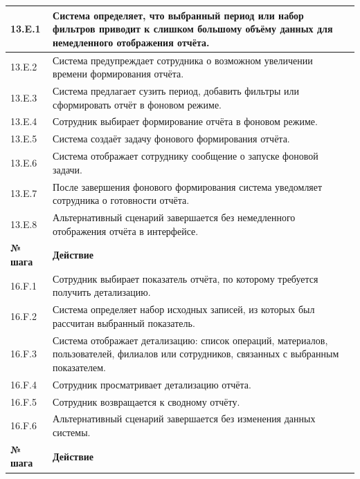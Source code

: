 \documentclass[12pt,a4paper]{article}
\begin{document}
\begin{xltabular}{\textwidth}{
				|>{\raggedright\arraybackslash}p{2.7cm}
				|>{\raggedright\arraybackslash}X|
			}
			13.E.1 & Система определяет, что выбранный период или набор фильтров
			приводит к слишком большому объёму данных для немедленного
			отображения отчёта. \\
			\hline
			13.E.2 & Система предупреждает сотрудника о возможном увеличении времени
			формирования отчёта. \\
			\hline
			13.E.3 & Система предлагает сузить период, добавить фильтры или сформировать
			отчёт в фоновом режиме. \\
			\hline
			13.E.4 & Сотрудник выбирает формирование отчёта в фоновом режиме. \\
			\hline
			13.E.5 & Система создаёт задачу фонового формирования отчёта. \\
			\hline
			13.E.6 & Система отображает сотруднику сообщение о запуске фоновой задачи. \\
			\hline
			13.E.7 & После завершения фонового формирования система уведомляет
			сотрудника о готовности отчёта. \\
			\hline
			13.E.8 & Альтернативный сценарий завершается без немедленного отображения
			отчёта в интерфейсе. \\
			\hline
			
			
			\textbf{№ шага} & \textbf{Действие} \\
			\hline
			
			16.F.1 & Сотрудник выбирает показатель отчёта, по которому требуется получить
			детализацию. \\
			\hline
			16.F.2 & Система определяет набор исходных записей, из которых был рассчитан
			выбранный показатель. \\
			\hline
			16.F.3 & Система отображает детализацию: список операций, материалов,
			пользователей, филиалов или сотрудников, связанных с выбранным
			показателем. \\
			\hline
			16.F.4 & Сотрудник просматривает детализацию отчёта. \\
			\hline
			16.F.5 & Сотрудник возвращается к сводному отчёту. \\
			\hline
			16.F.6 & Альтернативный сценарий завершается без изменения данных системы. \\
			\hline
			
			
			\textbf{№ шага} & \textbf{Действие} \\
			\hline
			

\end{xltabular}
\end{document}
